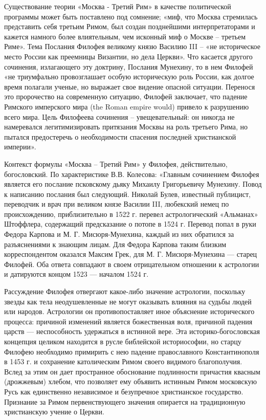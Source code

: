 \documentclass[a4paper, 12pt]{article}
\begin{document}
Существование теории «Москва - Третий Рим» в качестве политической программы может быть поставлено под сомнение; «миф, что Москва стремилась представить себя третьим Римом, был создан позднейшими интерпретаторами и кажется намного более влиятельным, чем исконный миф о Москве – третьем Риме». Тема Послания Филофея великому князю Василию III – «не историческое место России как преемницы Византии, но дела Церкви». Что касается другого сочинения, излагающего эту доктрину, Послания Мунехину, то в нем Филофей «не триумфально провозглашает особую историческую роль России, как долгое время полагали ученые, но выражает свое видение опасной ситуации. Перенося это пророчество на современную ситуацию, Филофей заключает, что падение Римского имперского мира (the Roman empire would) привело к разрушению всего мира. Цель Филофеева сочинения – увещевательный: он никогда не намеревался легитимизировать притязания Москвы на роль третьего Рима, но пытался предостеречь о необходимости спасения последней христианской империи».

Контекст формулы «Москва – Третий Рим» у Филофея, действительно, богословский. По характеристике В.В. Колесова: «Главным сочинением Филофея является его послание псковскому дьяку Михаилу Григорьевичу Мунехину. Повод к написанию послания был следующий. Николай Булев, известный публицист, переводчик и врач при великом князе Василии III, любекский немец по происхождению, приблизительно в 1522 г. перевел астрологический «Альманах» Штоффлера, содержащий предсказание о потопе в 1524 г. Перевод попал в руки Федора Карпова и М. Г. Мисюря-Мунехина, каждый из них обратился за разъяснениями к знающим лицам. Для Федора Карпова таким близким корреспондентом оказался Максим Грек, для М. Г. Мисюря-Мунехина — старец Филофей. Оба ответа совпадают в своем отрицательном отношении к астрологии и датируются концом 1523 — началом 1524 г.

Рассуждение Филофея отвергают какое-либо значение астрологии, поскольку звезды как тела неодушевленные не могут оказывать влияния на судьбы людей или народов. Астрологии он противопоставляет иное объяснение исторического процесса: причиной изменений является божественная воля, причиной падения царств — неспособность удержаться в истинной вере. Эта историко-богословская концепция целиком находится в русле библейской историософии, но старцу Филофею необходимо примирить с нею падение православного Константинополя в 1453 г. и сохранение католическим Римом своего видимого благополучия. Вслед за этим он дает пространное обоснование подлинности причастия квасным (дрожжевым) хлебом, что позволяет ему объявить истинным Римом московскую Русь как единственно независимое и безупречное христианское государство. Признание за Римом первенствующего значения опирается на традиционную христианскую учение о Церкви.
\end{document}
